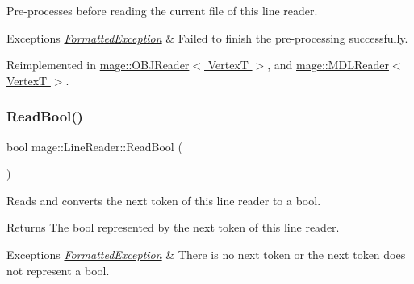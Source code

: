 Pre-\/processes before reading the current file of this line reader.


\begin{DoxyExceptions}{Exceptions}
{\em \hyperlink{structmage_1_1_formatted_exception}{Formatted\+Exception}} & Failed to finish the pre-\/processing successfully. \\
\hline
\end{DoxyExceptions}


Reimplemented in \hyperlink{classmage_1_1_o_b_j_reader_ae3a3ad3b50f1dd8dffe3109fc7dc2937}{mage\+::\+O\+B\+J\+Reader$<$ Vertex\+T $>$}, and \hyperlink{classmage_1_1_m_d_l_reader_a8b99fb3bdea5e9dae156b135c160c22d}{mage\+::\+M\+D\+L\+Reader$<$ Vertex\+T $>$}.

\hypertarget{classmage_1_1_line_reader_a86289c358afe9b3bc5c7789bb8a6af95}{}\label{classmage_1_1_line_reader_a86289c358afe9b3bc5c7789bb8a6af95} 
\subsubsection{\texorpdfstring{Read\+Bool()}{ReadBool()}}
{\footnotesize\ttfamily bool mage\+::\+Line\+Reader\+::\+Read\+Bool (\begin{DoxyParamCaption}{ }\end{DoxyParamCaption})\hspace{0.3cm}{\ttfamily [protected]}}

Reads and converts the next token of this line reader to a {\ttfamily bool}.

\begin{DoxyReturn}{Returns}
The {\ttfamily bool} represented by the next token of this line reader. 
\end{DoxyReturn}

\begin{DoxyExceptions}{Exceptions}
{\em \hyperlink{structmage_1_1_formatted_exception}{Formatted\+Exception}} & There is no next token or the next token does not represent a {\ttfamily bool}. \\
\hline
\end{DoxyExceptions}
\hypertarget{classmage_1_1_line_reader_ad915c1a17549c7758c10f0b6db7e5611}{}\label{classmage_1_1_line_reader_ad915c1a17549c7758c10f0b6db7e5611} 
